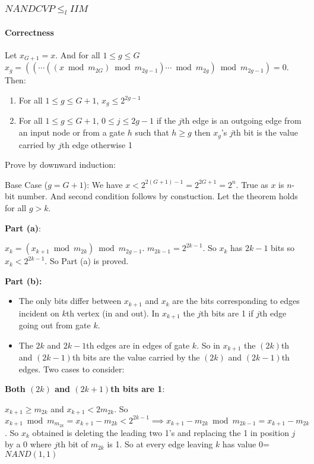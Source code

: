 \documentclass[article,8pt]{beamer}%
\begin{document}
\begin{frame}[allowframebreaks]
\frametitle{$NANDCVP\leq_l IIM$}
\framesubtitle{Correctness}
\begin{theorem}
	Let $x_{G+1}=x$. And for all $1\leq g\leq G$ $x_g=((\cdots ((x\bmod{m_{2G}})\bmod{m_{2g-1}})\cdots\bmod{m_{2g}})\bmod{m_{2g-1}})=0$. Then:\begin{enumerate}
		\item For all $1\leq g\leq G+1$, $x_g\leq 2^{2g-1}$
		\item For all $1\leq g\leq G+1$, $0\leq j\leq 2g-1$ if the $j$th edge is an outgoing edge from an input node or from a gate $h$ such that $h\geq g$ then $x_g$'s $j$th bit is the value carried by $j$th edge 		otherwise 1
	\end{enumerate}
\end{theorem}
\framebreak


Prove by downward induction:

\hspace{0.5cm} Base Case ($g=G+1$): We have $x< 2^{2(G+1)-1}=2^{2G+1}=2^{n}$. True as $x$ is $n$-bit number. And second condition follows by constuction.
Let the theorem holds for all $g>k$. 

\textbf{Part (a)}:

\hspace{0.5cm} $x_k=(x_{k+1}\bmod{m_{2k}})\bmod{m_{2g-1}}$. $m_{2k-1}=2^{2k-1}$. So $x_k$ has $2k-1$ bits so $ x_k<2^{2k-1}$. So Part (a) is proved.

\textbf{Part (b):}
\begin{itemize}
	\item The only bits differ between $x_{k+1}$ and $x_k$ are the bits corresponding to edges incident on $k$th vertex (in and out). In $x_{k+1}$ the $j$th bits are 1 if $j$th edge going out from gate $k$.
	\item The $2k$ and $2k-1$th edges are in edges of gate $k$. So in $x_{k+1}$ the $(2k)$th and $(2k-1)$th bits are the value carried by the $(2k)$ and $(2k-1)$th edges. Two cases to consider:
\end{itemize}
\framebreak

\textbf{Both $(2k)$ and $(2k+1)$th bits are 1}: 

$x_{k+1}\geq m_{2k}$ and $x_{k+1}< 2m_{2k}$. So $x_{k+1}\bmod{m_{m_{2k}}}=x_{k+1}-m_{2k}<2^{2k-1}\implies x_{k+1}-m_{2k}\bmod m_{2k-1}=x_{k+1}-m_{2k}$. So $x_k$ obtained is deleting the leading two 1's and replacing the 1 in position $j$ by a 0 where $j$th bit of $m_{2k}$ is 1. So at every edge leaving $k$ has value 0=$NAND(1,1)$\vspace{5mm}


\end{frame}
\end{document}
